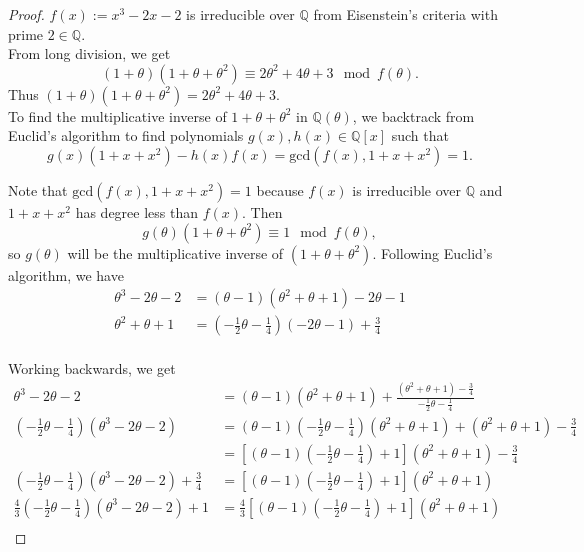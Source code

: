 \documentclass{article}
\begin{document}
  \begin{proof}
    $f(x):=x^3-2x-2$ is irreducible over $\mathbb{Q}$ from Eisenstein's
    criteria with prime $2\in\mathbb{Q}$. \\

    From long division, we get
    \[(1+\theta)(1+\theta+\theta^2) \equiv 2\theta^2+4\theta+3
    \mod{f(\theta)}.\]
    Thus $(1+\theta)(1+\theta+\theta^2) =2\theta^2+4\theta+3$. \\

    To find the multiplicative inverse of $1+\theta+\theta^2$ in
    $\mathbb{Q}(\theta)$, we backtrack from Euclid's algorithm to find
    polynomials $g(x),h(x)\in\mathbb{Q}[x]$ such that
    \[g(x)(1+x+x^2) -h(x)f(x) =\text{gcd}(f(x),1+x+x^2)=1.\]

    Note that $\text{gcd}(f(x),1+x+x^2)=1$ because $f(x)$ is irreducible
    over $\mathbb{Q}$ and $1+x+x^2$ has degree less than $f(x)$. Then
    \[g(\theta)(1+\theta+\theta^2) \equiv 1 \mod{f(\theta)},\]
    so $g(\theta)$ will be the multiplicative inverse of
    $(1+\theta+\theta^2)$. Following Euclid's algorithm, we have
    \begin{align*}
      \theta^3-2\theta-2 &=(\theta-1)(\theta^2+\theta+1) -2\theta-1\\
      \theta^2+\theta+1 &=\left(-\frac{1}{2}\theta-\frac{1}{4}\right)
        (-2\theta-1) +\frac{3}{4}\\
    \end{align*}

    Working backwards, we get
    \begin{align*}
      \theta^3-2\theta-2 &=(\theta-1)(\theta^2+\theta+1)
        +\frac{(\theta^2+\theta+1)-\frac{3}{4}}
        {-\frac{1}{2}\theta-\frac{1}{4}}\\
      \left(-\frac{1}{2}\theta-\frac{1}{4}\right) (\theta^3-2\theta-2)
        &=(\theta-1) \left(-\frac{1}{2}\theta -\frac{1}{4}\right)
        (\theta^2+\theta+1) +(\theta^2+\theta+1)-\frac{3}{4}\\
      &=\left[(\theta-1) \left(-\frac{1}{2}\theta-\frac{1}{4}\right) +1
        \right] (\theta^2+\theta+1) -\frac{3}{4}\\
      \left(-\frac{1}{2}\theta-\frac{1}{4}\right) (\theta^3-2\theta-2)
        +\frac{3}{4}
        &=\left[(\theta-1) \left(-\frac{1}{2}\theta-\frac{1}{4}\right) +1
        \right] (\theta^2+\theta+1)\\
      \frac{4}{3} \left(-\frac{1}{2}\theta-\frac{1}{4}\right)
        (\theta^3-2\theta-2) +1
        &=\frac{4}{3} \left[(\theta-1)
        \left(-\frac{1}{2}\theta-\frac{1}{4}\right) +1 \right]
        (\theta^2+\theta+1)\\
    \end{align*}


\end{proof}
\end{document}
